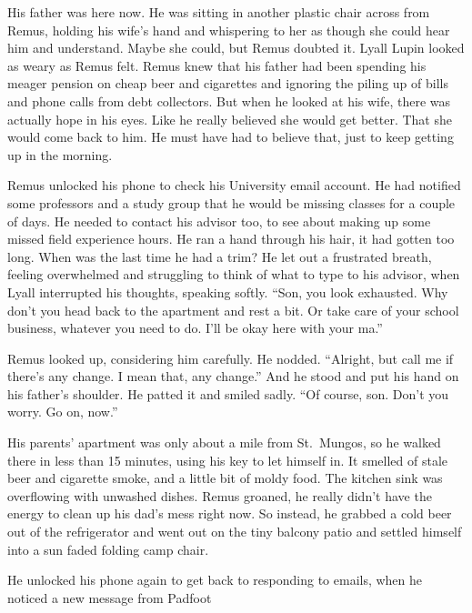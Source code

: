 \documentclass[12pt,twoside,openright]{memoir}
\begin{document}
His father was here now. He was sitting in another plastic chair across from Remus, holding his wife's hand and whispering to her as though she could hear him and understand. Maybe she could, but Remus doubted it. Lyall Lupin looked as weary as Remus felt. Remus knew that his father had been spending his meager pension on cheap beer and cigarettes and ignoring the piling up of bills and phone calls from debt collectors. But when he looked at his wife, there was actually hope in his eyes. Like he really believed she would get better. That she would come back to him. He must have had to believe that, just to keep getting up in the morning.

Remus unlocked his phone to check his University email account. He had notified some professors and a study group that he would be missing classes for a couple of days. He needed to contact his advisor too, to see about making up some missed field experience hours. He ran a hand through his hair, it had gotten too long. When was the last time he had a trim? He let out a frustrated breath, feeling overwhelmed and struggling to think of what to type to his advisor, when Lyall interrupted his thoughts, speaking softly. ``Son, you look exhausted. Why don't you head back to the apartment and rest a bit. Or take care of your school business, whatever you need to do. I'll be okay here with your ma.''

Remus looked up, considering him carefully. He nodded. ``Alright, but call me if there's any change. I mean that, any change.'' And he stood and put his hand on his father's shoulder. He patted it and smiled sadly. ``Of course, son. Don't you worry. Go on, now.''

His parents' apartment was only about a mile from St.\ Mungos, so he walked there in less than 15 minutes, using his key to let himself in. It smelled of stale beer and cigarette smoke, and a little bit of moldy food. The kitchen sink was overflowing with unwashed dishes. Remus groaned, he really didn't have the energy to clean up his dad's mess right now. So instead, he grabbed a cold beer out of the refrigerator and went out on the tiny balcony patio and settled himself into a sun faded folding camp chair.

He unlocked his phone again to get back to responding to emails, when he noticed a new message from Padfoot
\end{document}
